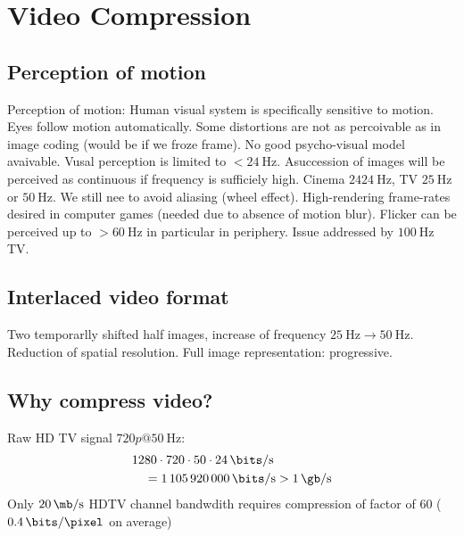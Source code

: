 \setcounter{chapter}{8}
\chapter{Video Compression}
\section{Perception of motion}
Perception of motion: Human visual system is specifically sensitive to motion. Eyes follow motion automatically. Some distortions are not as percoivable as in image coding (would be if we froze frame). No good psycho-visual model avaivable. Vusal perception is limited to $<\SI{24}{\hertz}$. Asuccession of images will be perceived as continuous if frequency is sufficiely high. Cinema $24\SI{24}{\hertz}$, TV $\SI{25}{\hertz}$ or $\SI{50}{\hertz}$. We still nee to avoid aliasing (wheel effect). High-rendering frame-rates desired in computer games (needed due to absence of motion blur). Flicker can be perceived up to $>\SI{60}{\hertz}$ in particular in periphery. Issue addressed by $\SI{100}{\hertz}$ TV.
\section{Interlaced video format}
Two temporarlly shifted half images, increase of frequency $\SI{25}{\hertz}\to\SI{50}{\hertz}$. Reduction of spatial resolution. Full image representation: progressive.
\section{Why compress video?}
Raw HD TV signal $720p@\SI{50}{\hertz}$:
\begin{align*}
	&1280\cdot720\cdot50\cdot\SI{24}{\bits/\second}\\
	&\quad=\SI{1105920000}{\bits/\second}>\SI{1}{\gb/\second}
\end{align*}
Only $\SI{20}{\mb/\second}$ HDTV channel bandwdith requires compression of factor of $60$ ($\SI{0.4}{\bits/\pixel}$ on average)
